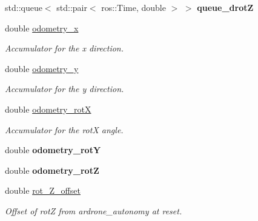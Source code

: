\begin{DoxyCompactItemize}
\item 
\mbox{\label{classPoseEstimator_ab3b5a648096b51fd9ea556bd241e3275}} 
std\+::queue$<$ std\+::pair$<$ ros\+::\+Time, double $>$ $>$ {\bfseries queue\+\_\+drotZ}
\item 
\mbox{\label{classPoseEstimator_a47569959ece1772e0718bd4db647075b}} 
double \hyperlink{classPoseEstimator_a47569959ece1772e0718bd4db647075b}{odometry\+\_\+x}
\begin{DoxyCompactList}\small\item\em Accumulator for the x direction. \end{DoxyCompactList}\item 
\mbox{\label{classPoseEstimator_a8d021c53559e3eed37042daa129886e0}} 
double \hyperlink{classPoseEstimator_a8d021c53559e3eed37042daa129886e0}{odometry\+\_\+y}
\begin{DoxyCompactList}\small\item\em Accumulator for the y direction. \end{DoxyCompactList}\item 
\mbox{\label{classPoseEstimator_a7e5f70725c486fc98a3496dfd54038e2}} 
double \hyperlink{classPoseEstimator_a7e5f70725c486fc98a3496dfd54038e2}{odometry\+\_\+rotX}
\begin{DoxyCompactList}\small\item\em Accumulator for the rotX angle. \end{DoxyCompactList}\item 
\mbox{\label{classPoseEstimator_a42f6e82ce30e665dee169bbd77d838c3}} 
double {\bfseries odometry\+\_\+rotY}
\item 
\mbox{\label{classPoseEstimator_a7d5b45620b52bb2d796466fb686ef3b7}} 
double {\bfseries odometry\+\_\+rotZ}
\item 
\mbox{\label{classPoseEstimator_af29239cea591731035f1d28baa5f4948}} 
double \hyperlink{classPoseEstimator_af29239cea591731035f1d28baa5f4948}{rot\+\_\+\+Z\+\_\+offset}
\begin{DoxyCompactList}\small\item\em Offset of rotZ from ardrone\+\_\+autonomy at reset. \end{DoxyCompactList}\item 

\end{DoxyCompactItemize}
